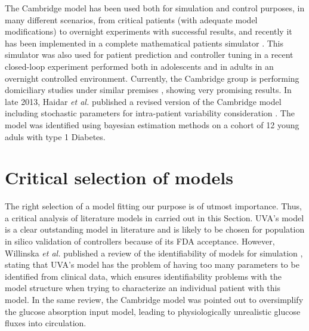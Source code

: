 The Cambridge model has been used both for simulation and control purposes, in many different scenarios, from critical patients \cite{hovorka2007blood} (with adequate model modifications) to overnight experiments \cite{hovorka2004nonlinear} with successful results, and recently it has been implemented in a complete mathematical patients simulator \cite{simuladorhovorka}. This simulator was also used for patient prediction and controller tuning in a recent closed-loop experiment performed both in adolescents \cite{hovorka2010manual} and in adults \cite{hovorka2011overnight} in an overnight controlled environment. Currently, the Cambridge group is performing domiciliary studies under similar premises \cite{hovorka2013assessing}, showing very promising results. In late 2013, Haidar \textit{et al.} published a revised version of the Cambridge model including stochastic parameters for intra-patient variability consideration \cite{haidar2013stochastic}. The model was identified using bayesian estimation methods on a cohort of 12 young aduls with type 1 Diabetes.

\section{Critical selection of models}
\label{sec:CriticalSelectionOfModels}


The right selection of a model fitting our purpose is of utmost importance. Thus, a critical analysis of literature models in carried out in this Section. UVA's model is a clear outstanding model in literature and is likely to be chosen for population in silico validation of controllers because of its FDA acceptance. However, Willinska \textit{et al.} published a review of the identifiability of models for simulation \cite{wilinska2009simulation}, stating that UVA's model has the problem of having too many parameters to be identified from clinical data, which ensures identifiability problems with the model structure when trying to characterize an individual patient with this model. In the same review, the Cambridge model was pointed out to oversimplify the glucose absorption input model, leading to physiologically unrealistic glucose fluxes into circulation.

